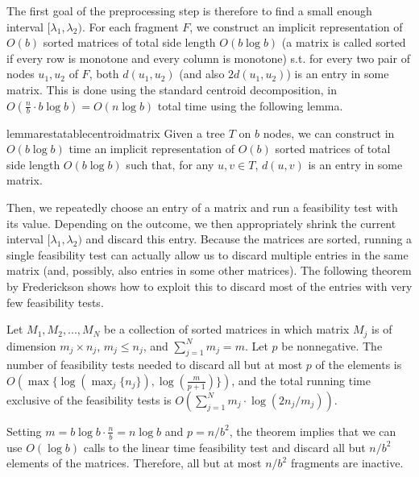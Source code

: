 \documentclass[a4paper,UKenglish]{lipics-v2016}
\theoremstyle{plain}
\begin{document}
The first goal of the preprocessing step is therefore to find a small enough interval $[\lambda_1,\lambda_2)$.
For each fragment $F$, we construct an implicit representation of $O(b)$ sorted matrices of total side length $O(b\log b)$
(a matrix is called sorted if every row is monotone and every column is monotone) s.t. for every two pair of nodes $u_1,u_2$ of $F$, both $d(u_1,u_2)$ (and also $2d(u_1,u_2)$) is an entry in some matrix. This is done using the standard centroid 
decomposition, in $O(\frac n b \cdot b\log b)=O(n\log b)$ total time using the following lemma. 
\begin{restatable}{lemmarestatable}{centroidmatrix}
Given a tree $T$ on $b$ nodes, we can construct in $O(b\log b)$ time an implicit representation of $O(b)$ sorted matrices of total
side length $O(b\log b)$ such that, for any $u,v\in T$, $d(u,v)$ is an entry in some matrix.
\end{restatable}
Then, we repeatedly choose an entry of a matrix and run a feasibility test with its value.  %
Depending on the outcome, we then appropriately shrink the current interval $[\lambda_{1},\lambda_{2})$ and discard this entry.
Because the matrices are sorted, running a single feasibility test can actually allow us to discard multiple entries in the same matrix
(and, possibly, also entries in some other matrices). The following theorem by Frederickson shows how to exploit this to discard most
of the entries with very few feasibility tests.

\begin{theorem}\label{Frederickson's theorem}
Let  ${M_1, M_2, . . . , M_N}$ be a collection of sorted matrices in which matrix $M_j$ is of dimension $m_j \times n_j$, $m_j \leq n_j$, and $\sum_{j=1}^{N} m_j = m$.
Let $p$ be nonnegative. The number of feasibility tests needed to discard all but at most $p$ of the elements is $O(\max \lbrace \log(\max_{j} \lbrace n_j \rbrace), \log(\frac{m}{p+1}) \rbrace)$, and the total running time exclusive of the feasibility tests is $O(\sum_{j=1}^{N} m_j \cdot \log (2n_j/m_j))$.
\end{theorem}

Setting $m=b \log b \cdot \frac{n}{b} = n \log b$ and $p=n/b^2$, the theorem implies that we can use $O(\log b)$ calls to the linear time feasibility test and discard all but $n/b^2$ elements of the matrices. Therefore, all but at most $n/b^{2}$ fragments are inactive.
\end{document}

